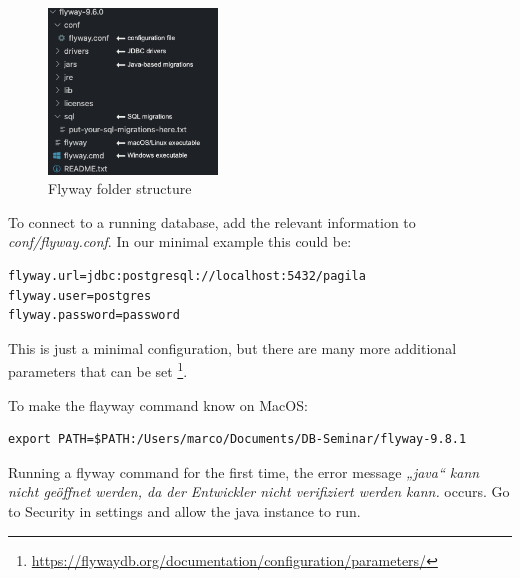 \begin{figure}[H]
    \centering
    \includegraphics[width=0.4\textwidth]{./chapters/intro_flyway/images/flyway_folder_structure}
   \caption[Flyway folder structure - Source: Own illustration]{Flyway folder structure}
    \label{fig:flyway_folder_structure}
\end{figure}


%
To connect to a running database, add the relevant information to \textit{conf/flyway.conf}.
In our minimal example this could be:

\begin{lstlisting}[caption=Minimal configuration]
flyway.url=jdbc:postgresql://localhost:5432/pagila
flyway.user=postgres
flyway.password=password
\end{lstlisting}

This is just a minimal configuration, but there are many more additional parameters that can be set \footnote{\url{https://flywaydb.org/documentation/configuration/parameters/}}.


%
To make the flayway command know on MacOS:
\begin{lstlisting}[caption=Minimal configuration]
export PATH=$PATH:/Users/marco/Documents/DB-Seminar/flyway-9.8.1
\end{lstlisting}
Running a flyway command for the first time, the error message \textit{„java“ kann nicht geöffnet werden, da der Entwickler nicht verifiziert werden kann.} occurs. Go to Security in settings and allow the java instance to run.

\newpage
